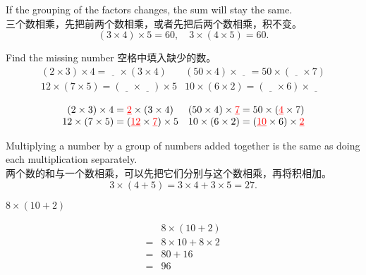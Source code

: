 \begin{newprop}
If the grouping of the factors changes, the sum will stay the same. \\
三个数相乘，先把前两个数相乘，或者先把后两个数相乘，积不变。
$$
(3\times4)\times 5 = 60, \quad 3\times(4\times5) = 60.
$$
\end{newprop}

\begin{example}
Find the missing number 空格中填入缺少的数。
$$
\begin{matrix}
(2\times3)\times 4= \underline{\quad} \times (3\times 4) & (50\times 4)\times \underline{\quad} = 50\times(\underline{\quad}\times 7)\\
12\times(7\times 5) = (\underline{\quad}\times \underline{\quad}) \times 5 & 10\times (6\times 2) = (\underline{\quad}\times 6)\times \underline{\quad}
\end{matrix}
$$
\end{example}
\begin{solution}
$$
\begin{matrix}
(2\times3)\times 4= \underline{\color{red}  2} \times (3\times 4) & (50\times 4)\times \underline{\color{red}  7} = 50\times(\underline{\color{red} 4}\times 7)\\
12\times(7\times 5) = (\underline{\color{red}  12}\times \underline{\color{red} 7}) \times 5 & 10\times (6\times 2) = (\underline{\color{red} 10}\times 6)\times \underline{\color{red}  2}
\end{matrix}
$$
\end{solution}

\begin{newprop}
Multiplying a number by a group of numbers added together is the same as doing each multiplication separately.\\
两个数的和与一个数相乘，可以先把它们分别与这个数相乘，再将积相加。
$$
3\times(4+5) = 3\times 4 + 3\times 5 = 27.
$$
\end{newprop}

\begin{example}
$8\times (10+2)$
\end{example}
\begin{solution}
\begin{align*}
&8\times (10+2)\\
=&8\times 10 + 8\times 2\\
=& 80 + 16\\
=& 96
\end{align*}
\end{solution}

